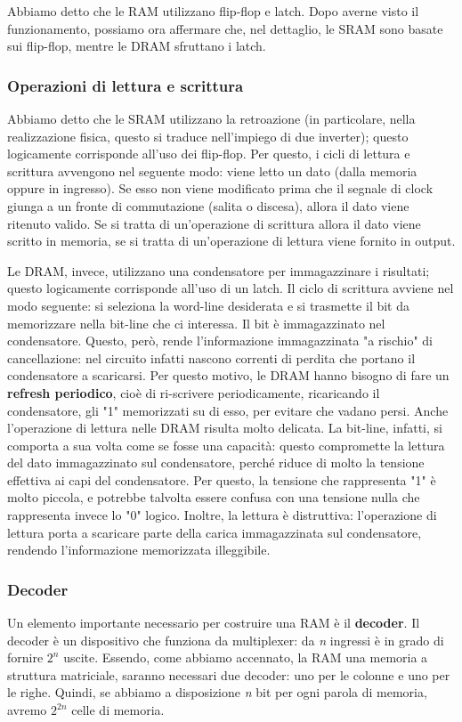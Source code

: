 \documentclass[\main/main.tex]{subfiles}
\begin{document}
Abbiamo detto che le RAM utilizzano flip-flop e latch. Dopo averne visto il funzionamento, possiamo ora affermare che, nel dettaglio, le SRAM sono basate sui flip-flop, mentre le DRAM sfruttano i latch.

\subsubsection{Operazioni di lettura e scrittura}
Abbiamo detto che le SRAM utilizzano la retroazione (in particolare, nella realizzazione fisica, questo si traduce nell'impiego di due inverter); questo logicamente corrisponde all'uso dei flip-flop.
Per questo, i cicli di lettura e scrittura avvengono nel seguente modo: viene letto un dato (dalla memoria oppure in ingresso). Se esso non viene modificato prima che il segnale di clock giunga a un fronte di commutazione (salita o discesa), allora il dato viene ritenuto valido.
Se si tratta di un'operazione di scrittura allora il dato viene scritto in memoria, se si tratta di un'operazione di lettura viene fornito in output.

Le DRAM, invece, utilizzano una condensatore per immagazzinare i risultati; questo logicamente corrisponde all'uso di un latch.
Il ciclo di scrittura avviene nel modo seguente: si seleziona la word-line desiderata e si trasmette il bit da memorizzare nella bit-line che ci interessa. Il bit è immagazzinato nel condensatore.
Questo, però, rende l'informazione immagazzinata "a rischio" di cancellazione: nel circuito infatti nascono correnti di perdita che portano il condensatore a scaricarsi. Per questo motivo, le DRAM hanno bisogno di fare un \textbf{refresh periodico}, cioè di ri-scrivere periodicamente, ricaricando il condensatore, gli "1" memorizzati su di esso, per evitare che vadano persi.
Anche l'operazione di lettura nelle DRAM risulta molto delicata. La bit-line, infatti, si comporta a sua volta come se fosse una capacità: questo compromette la lettura del dato immagazzinato sul condensatore, perché riduce di molto la tensione effettiva ai capi del condensatore. Per questo, la tensione che rappresenta "1" è molto piccola, e potrebbe talvolta essere confusa con una tensione nulla che rappresenta invece lo "0" logico.
Inoltre, la lettura è distruttiva: l'operazione di lettura porta a scaricare parte della carica immagazzinata sul condensatore, rendendo l'informazione memorizzata illeggibile.

\subsubsection{Decoder}
Un elemento importante necessario per costruire una RAM è il \textbf{decoder}.
Il decoder è un dispositivo che funziona da multiplexer: da \textit{n} ingressi è in grado di fornire $2^n$ uscite.
Essendo, come abbiamo accennato, la RAM una memoria a struttura matriciale, saranno necessari due decoder: uno per le colonne e uno per le righe.
Quindi, se abbiamo a disposizione \textit{n} bit per ogni parola di memoria, avremo $2^{2n}$ celle di memoria.
\end{document}
